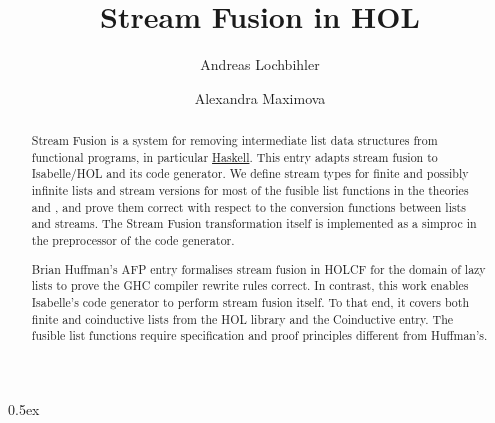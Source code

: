 \documentclass[11pt,a4paper]{scrartcl}
\begin{document}
\title{Stream Fusion in HOL}
\author{Andreas Lochbihler \and Alexandra Maximova}
\maketitle

\begin{abstract}
  Stream Fusion is a system for removing intermediate list data structures from functional programs,
  in particular \href{http://hackage.haskell.org/package/stream-fusion}{Haskell}.
  This entry adapts stream fusion to Isabelle/HOL and its code generator.
  We define stream types for finite and possibly infinite lists and stream versions for most of the
  fusible list functions in the theories  and ,
  and prove them correct with respect to the conversion functions between lists and streams.
  The Stream Fusion transformation itself is implemented as a simproc in the preprocessor of the 
  code generator.

  Brian Huffman's AFP entry \cite{Huffman2009AFP} formalises stream fusion in HOLCF for the domain of lazy lists to prove the GHC compiler rewrite rules correct.
  In contrast, this work enables Isabelle's code generator to perform stream fusion itself.
  To that end, it covers both finite and coinductive lists from the HOL library and the Coinductive entry.
  The fusible list functions require specification and proof principles different from Huffman's.
\end{abstract}

\clearpage

\tableofcontents

\clearpage

\parindent 0pt\parskip 0.5ex



%



\end{document}
